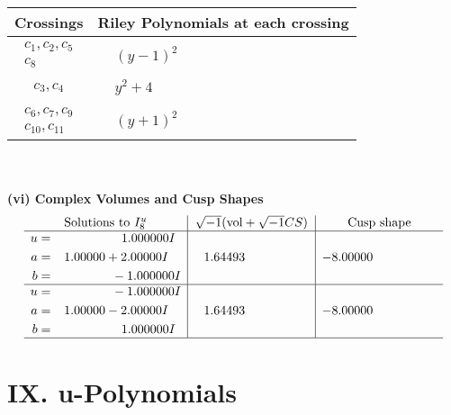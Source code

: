 \documentclass[1p]{elsarticle_modified}
\theoremstyle{definition}
\newcommand{\I}{\sqrt{-1}}
\begin{document}
\begin{tabular}{m{50pt}|m{274pt}}
Crossings & \hspace{64pt}Riley Polynomials at each crossing \\
\hline $$\begin{aligned}c_{1},c_{2},c_{5}\\c_{8}\end{aligned}$$&$\begin{aligned}
&(y-1)^2
\end{aligned}$\\
\hline $$\begin{aligned}c_{3},c_{4}\end{aligned}$$&$\begin{aligned}
&y^2+4
\end{aligned}$\\
\hline $$\begin{aligned}c_{6},c_{7},c_{9}\\c_{10},c_{11}\end{aligned}$$&$\begin{aligned}
&(y+1)^2
\end{aligned}$\\
\hline
\end{tabular}\\~\\
\newpage\flushleft \textbf{(vi) Complex Volumes and Cusp Shapes}
$$\begin{array}{c|c|c}  
\text{Solutions to }I^u_{8}& \I (\text{vol} + \sqrt{-1}CS) & \text{Cusp shape}\\
 \hline 
\begin{aligned}
u &= \phantom{-0.000000 -}1.000000 I \\
a &= \phantom{-}1.00000 + 2.00000 I \\
b &= \phantom{-0.000000 } -1.000000 I\end{aligned}
 & \phantom{-}1.64493\phantom{ +0.000000I} & -8.00000\phantom{ +0.000000I} \\ \hline\begin{aligned}
u &= \phantom{-0.000000 } -1.000000 I \\
a &= \phantom{-}1.00000 - 2.00000 I \\
b &= \phantom{-0.000000 -}1.000000 I\end{aligned}
 & \phantom{-}1.64493\phantom{ +0.000000I} & -8.00000\phantom{ +0.000000I}\\
 \hline 
 \end{array}$$\newpage
\newpage\renewcommand{\arraystretch}{1}
\centering \section*{ IX. u-Polynomials}
\end{document}
